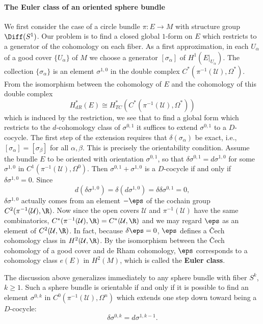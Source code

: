 \paragraph{The Euler class of an oriented sphere bundle}
We first consider the case of a circle bundle $\pi:E\to M$ with structure group $\Diff(S^1)$. Our problem is to find a closed global $1$-form on $E$ which restricts to 
a generator of the cohomology on each fiber. As a first approximation, in each $U_\alpha$ of a good cover $\{U_\alpha\}$ of $M$ we choose a generator $[\sigma_\alpha]$ 
of $H^1(E|_{U_\alpha})$. The collection $\{\sigma_\alpha\}$ is an element $\sigma^{1,0}$ in the double complex $C^*(\pi^{-1}(\mathcal{U}),\Omega^*)$. From the 
isomorphism between the cohomology of $E$ and the cohomology of this double complex
\[H^*_{dR}(E)\cong H_{TC}^*(C^*(\pi^{-1}(\mathcal{U}),\Omega^*))\]
which is induced by the restriction, we see that to find a global form which restricts to the $d$-cohomology class of $\sigma^{0,1}$ it suffices to extend 
$\sigma^{0,1}$ to a $D$-cocycle. The first step of the extension requires that $\delta(\sigma_\alpha)$ be exact, i.e., $[\sigma_\alpha]=[\sigma_\beta]$ for all 
$\alpha,\beta$. This is precisely the orientability condition. Assume the bundle $E$ to be oriented with orientation $\sigma^{0,1}$, so that $\delta\sigma^{0,1}=d\sigma^{1,0}$ 
for some $\sigma^{1,0}$ in $C^1(\pi^{-1}(\mathcal{U}),\Omega^0)$. Then $\sigma^{0,1}+\sigma^{1,0}$ is a $D$-cocycle if and only if $\delta\sigma^{1,0}=0$. Since
\[d(\delta\sigma^{1,0})=\delta(d\sigma^{1,0})=\delta\delta\sigma^{0,1}=0,\]
$\delta\sigma^{1,0}$ actually comes from an element $-\eps$ of the cochain group $C^2(\pi^{-1}(\mathcal{U}),\R)$. Now since the open covers $\mathcal{U}$ and $\pi^{-1}(\mathcal{U})$ 
have the same combinatorics, $C^*(\pi^{-1}(\mathcal{U}),\R)=C^*(\mathcal{U},\R)$ and we may regard $\eps$ as an element of $C^2(\mathcal{U},\R)$. In fact, because 
$\delta\eps=0$, $\eps$ defines a \v{C}ech cohomology class in $H^2(\mathcal{U},\R)$. By the isomorphism between the \v{C}ech cohomology of a good cover and de Rham 
cohomology, $\eps$ corresponds to a cohomology class $e(E)$ in $H^2(M)$, which is called the \textbf{Euler class}.\par
The discussion above generalizes immediately to any sphere bundle with fiber $S^k$, $k\geq 1$. Such a sphere bundle is orientable if and only if it is possible to find 
an element $\sigma^{0,k}$ in $C^0(\pi^{-1}(\mathcal{U}),\Omega^n)$ which extends one step down toward being a $D$-cocycle:
\[\delta\sigma^{0,k}=d\sigma^{1,k-1}.\]

